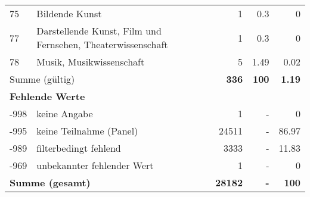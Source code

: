 \begin{longtable}{lXrrr}
        75 & \multicolumn{1}{X}{Bildende Kunst} & %
          \num{1} &
          \num[round-mode=places,round-precision=2]{0,3} &
          \num[round-mode=places,round-precision=2]{0} \\

        77 & \multicolumn{1}{X}{Darstellende Kunst, Film und Fernsehen, Theaterwissenschaft} & %
          \num{1} &
          \num[round-mode=places,round-precision=2]{0,3} &
          \num[round-mode=places,round-precision=2]{0} \\

        78 & \multicolumn{1}{X}{Musik, Musikwissenschaft} & %
          \num{5} &
          \num[round-mode=places,round-precision=2]{1,49} &
          \num[round-mode=places,round-precision=2]{0,02} \\

     \midrule
     \multicolumn{2}{l}{Summe (gültig)} &
       \textbf{\num{336}} &
     \textbf{100} &
       \textbf{\num[round-mode=places,round-precision=2]{1,19}} \\
     \multicolumn{5}{l}{\textbf{Fehlende Werte}}\\
       -998 &
       keine Angabe &
         \num{1} &
        - &
         \num[round-mode=places,round-precision=2]{0} \\
       -995 &
       keine Teilnahme (Panel) &
         \num{24511} &
        - &
         \num[round-mode=places,round-precision=2]{86,97} \\
       -989 &
       filterbedingt fehlend &
         \num{3333} &
        - &
         \num[round-mode=places,round-precision=2]{11,83} \\
       -969 &
       unbekannter fehlender Wert &
         \num{1} &
        - &
         \num[round-mode=places,round-precision=2]{0} \\
     \midrule
     \multicolumn{2}{l}{\textbf{Summe (gesamt)}} &
          \textbf{\num{28182}} &
        \textbf{-} &
        \textbf{100} \\
     \bottomrule
     \end{longtable}
     

